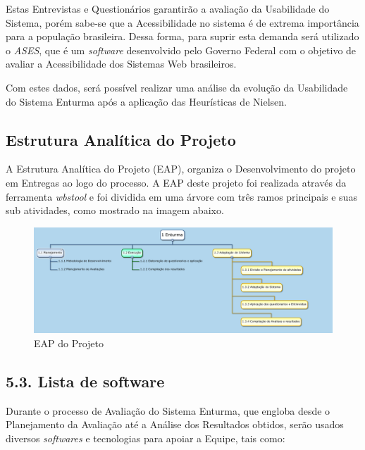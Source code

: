 	Estas Entrevistas e Questionários garantirão a avaliação da Usabilidade do Sistema, porém sabe-se que a Acessibilidade no sistema é de extrema importância para a população brasileira. Dessa forma, para suprir esta demanda será utilizado o \textit{ASES}, que é um \textit{software} desenvolvido pelo Governo Federal com o objetivo de avaliar a Acessibilidade dos Sistemas Web brasileiros.

	Com estes dados, será possível realizar uma análise da evolução da Usabilidade do Sistema Enturma após a aplicação das Heurísticas de Nielsen.

\subsection{Estrutura Analítica do Projeto}
	
	 A Estrutura Analítica do Projeto (EAP), organiza o Desenvolvimento do projeto em Entregas ao logo do processo. A EAP deste projeto foi realizada através da ferramenta \textit{wbstool} e foi dividida em uma árvore com três ramos principais e suas sub atividades, como mostrado na imagem abaixo.

	\begin{figure}[H]
		\centering
		\includegraphics[width=1\textwidth]{imagens/EAP}
		\caption{EAP do Projeto}
		\label{img:EAP}
	\end{figure}
	
	

\subsection{5.3. Lista de software}
	
	Durante o processo de Avaliação do Sistema Enturma, que engloba desde o Planejamento da Avaliação até a Análise dos Resultados obtidos, serão usados diversos \textit{softwares} e tecnologias para apoiar a Equipe, tais como:

